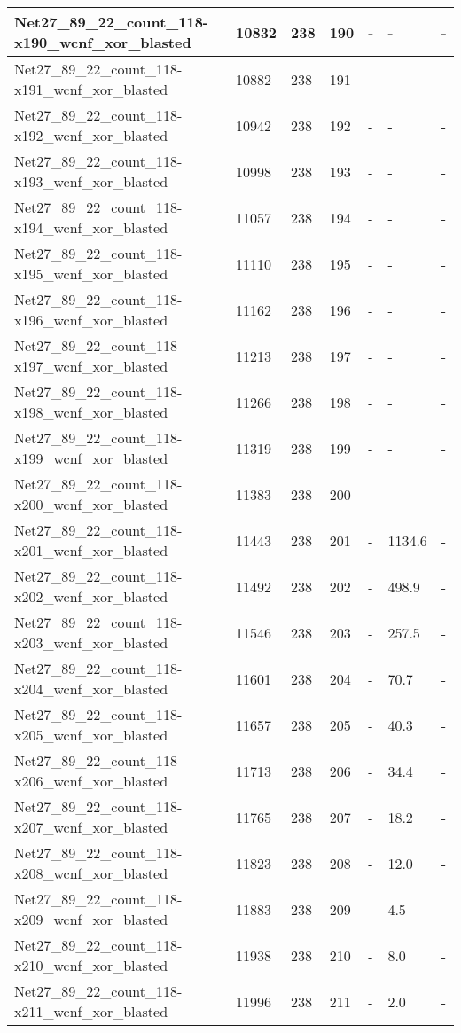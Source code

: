 \begin{scriptsize}
\begin{longtable}{|p{5cm}|l|l|l|l|l|l|}
Net27\_89\_22\_count\_118-x190\_wcnf\_xor\_blasted&10832&238&190&-&-&- \\ \hline 
Net27\_89\_22\_count\_118-x191\_wcnf\_xor\_blasted&10882&238&191&-&-&- \\ \hline 
Net27\_89\_22\_count\_118-x192\_wcnf\_xor\_blasted&10942&238&192&-&-&- \\ \hline 
Net27\_89\_22\_count\_118-x193\_wcnf\_xor\_blasted&10998&238&193&-&-&- \\ \hline 
Net27\_89\_22\_count\_118-x194\_wcnf\_xor\_blasted&11057&238&194&-&-&- \\ \hline 
Net27\_89\_22\_count\_118-x195\_wcnf\_xor\_blasted&11110&238&195&-&-&- \\ \hline 
Net27\_89\_22\_count\_118-x196\_wcnf\_xor\_blasted&11162&238&196&-&-&- \\ \hline 
Net27\_89\_22\_count\_118-x197\_wcnf\_xor\_blasted&11213&238&197&-&-&- \\ \hline 
Net27\_89\_22\_count\_118-x198\_wcnf\_xor\_blasted&11266&238&198&-&-&- \\ \hline 
Net27\_89\_22\_count\_118-x199\_wcnf\_xor\_blasted&11319&238&199&-&-&- \\ \hline 
Net27\_89\_22\_count\_118-x200\_wcnf\_xor\_blasted&11383&238&200&-&-&- \\ \hline 
Net27\_89\_22\_count\_118-x201\_wcnf\_xor\_blasted&11443&238&201&-&1134.6&- \\ \hline 
Net27\_89\_22\_count\_118-x202\_wcnf\_xor\_blasted&11492&238&202&-&498.9&- \\ \hline 
Net27\_89\_22\_count\_118-x203\_wcnf\_xor\_blasted&11546&238&203&-&257.5&- \\ \hline 
Net27\_89\_22\_count\_118-x204\_wcnf\_xor\_blasted&11601&238&204&-&70.7&- \\ \hline 
Net27\_89\_22\_count\_118-x205\_wcnf\_xor\_blasted&11657&238&205&-&40.3&- \\ \hline 
Net27\_89\_22\_count\_118-x206\_wcnf\_xor\_blasted&11713&238&206&-&34.4&- \\ \hline 
Net27\_89\_22\_count\_118-x207\_wcnf\_xor\_blasted&11765&238&207&-&18.2&- \\ \hline 
Net27\_89\_22\_count\_118-x208\_wcnf\_xor\_blasted&11823&238&208&-&12.0&- \\ \hline 
Net27\_89\_22\_count\_118-x209\_wcnf\_xor\_blasted&11883&238&209&-&4.5&- \\ \hline 
Net27\_89\_22\_count\_118-x210\_wcnf\_xor\_blasted&11938&238&210&-&8.0&- \\ \hline 
Net27\_89\_22\_count\_118-x211\_wcnf\_xor\_blasted&11996&238&211&-&2.0&- \\ \hline 

\end{longtable}
\end{scriptsize}
